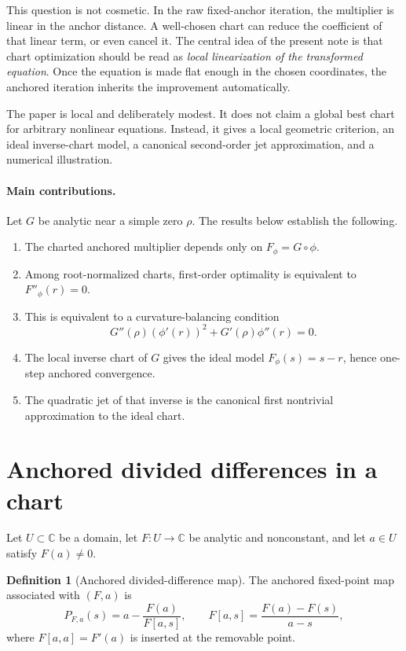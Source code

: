 \documentclass[11pt]{article}
\theoremstyle{definition}
\newtheorem{definition}[theorem]{Definition}
\newcommand{\C}{\mathbb{C}}
\begin{document}
This question is not cosmetic. In the raw fixed-anchor iteration, the multiplier is linear in the anchor distance. A well-chosen chart can reduce the coefficient of that linear term, or even cancel it. The central idea of the present note is that chart optimization should be read as \emph{local linearization of the transformed equation}. Once the equation is made flat enough in the chosen coordinates, the anchored iteration inherits the improvement automatically.

The paper is local and deliberately modest. It does not claim a global best chart for arbitrary nonlinear equations. Instead, it gives a local geometric criterion, an ideal inverse-chart model, a canonical second-order jet approximation, and a numerical illustration.

\paragraph{Main contributions.}
Let $G$ be analytic near a simple zero $\rho$. The results below establish the following.
\begin{enumerate}[label=(\roman*)]
    \item The charted anchored multiplier depends only on $F_{\phi}=G\circ\phi$.
    \item Among root-normalized charts, first-order optimality is equivalent to $F''_{\phi}(r)=0$.
    \item This is equivalent to a curvature-balancing condition
    \[
    G''(\rho)(\phi'(r))^2+G'(\rho)\phi''(r)=0.
    \]
    \item The local inverse chart of $G$ gives the ideal model $F_{\phi}(s)=s-r$, hence one-step anchored convergence.
    \item The quadratic jet of that inverse is the canonical first nontrivial approximation to the ideal chart.
\end{enumerate}

\section{Anchored divided differences in a chart}
Let $U\subset \C$ be a domain, let $F:U\to\C$ be analytic and nonconstant, and let $a\in U$ satisfy $F(a)\neq 0$.

\begin{definition}[Anchored divided-difference map]
The anchored fixed-point map associated with $(F,a)$ is
\begin{equation}\label{eq:anchored-map}
P_{F,a}(s)=a-\frac{F(a)}{F[a,s]},
\qquad
F[a,s]=\frac{F(a)-F(s)}{a-s},
\end{equation}
where $F[a,a]=F'(a)$ is inserted at the removable point.
\end{definition}
\end{document}
